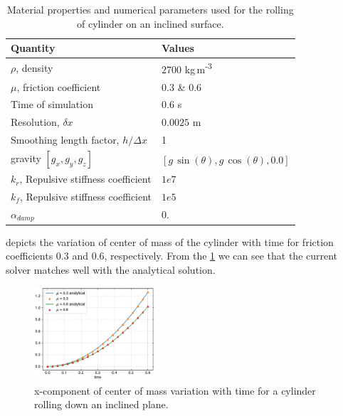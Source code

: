 \begin{table}[!ht]
  \centering
  \begin{tabular}[!ht]{ll}
    \toprule
    Quantity & Values\\
    \midrule
    $\rho$, density & $2700$ kg\,m\textsuperscript{-3} \\
    $\mu$, friction coefficient & $0.3$ \& $0.6$ \\
    Time of simulation & $0.6$ s \\
    Resolution, $\delta x$ & $0.0025$ m\\
    Smoothing length factor, $h/\Delta x$ & 1\\
    gravity $[g_x, g_y, g_z]$ & $[g\,\sin(\theta), g\,\cos(\theta), 0.0]$\\
    $k_r$, Repulsive stiffness coefficient & $1e7$ \\
    $k_f$, Repulsive stiffness coefficient & $1e5$ \\
    $\alpha_{damp}$ & 0.\\
    \bottomrule
  \end{tabular}
  \caption{Material properties and numerical parameters used for the rolling
    of cylinder on an inclined surface.}%
  \label{tab:circular-body-rolling-params}
\end{table}

 depicts the variation of center of mass of
the cylinder with time for friction coefficients $0.3$ and $0.6$,
respectively. From the \cref{fig:cylinder-xcom-vs-time} we can see that the
current solver matches well with the analytical solution.
\begin{figure}[!htpb]
  \centering
  \includegraphics[width=0.4\textwidth]{figures/rfc/figures/de_2021_cylinder_rolling_on_an_inclined_plane_2d/xcom_vs_time}
  \caption{x-component of center of mass variation with time for a cylinder
    rolling down an inclined plane.}
\label{fig:cylinder-xcom-vs-time}
\end{figure}


\FloatBarrier%
